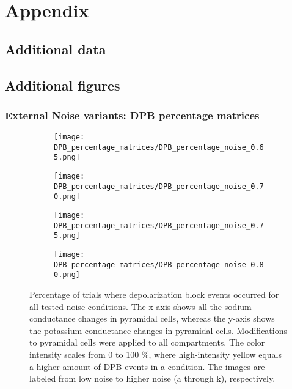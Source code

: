 \chapter{Appendix}\label{ch:appendix_c}

\section{Additional data}

\section{Additional figures}
\pagebreak
\subsection{External Noise variants: DPB percentage matrices}\label{subsec:DPB_percentage_matrices}
\begin{figure}[!ht]
    \centering
    \begin{subfigure}{0.48\textwidth}
        \texttt{[image: DPB\_percentage\_matrices/DPB\_percentage\_noise\_0.65.png]}
        \caption{} %
    \end{subfigure}\hfill
    \begin{subfigure}{0.48\textwidth}
        \texttt{[image: DPB\_percentage\_matrices/DPB\_percentage\_noise\_0.70.png]}
        \caption{} %
    \end{subfigure}

    \bigskip %

    \begin{subfigure}{0.48\textwidth}
        \texttt{[image: DPB\_percentage\_matrices/DPB\_percentage\_noise\_0.75.png]}
        \caption{} %
    \end{subfigure}\hfill
    \begin{subfigure}{0.48\textwidth}
        \texttt{[image: DPB\_percentage\_matrices/DPB\_percentage\_noise\_0.80.png]}
        \caption{} %
    \end{subfigure}

    \caption[DPB percentage matrices (all)]{Percentage of trials where depolarization block events occurred for all tested noise conditions.
        The x-axis shows all the sodium conductance changes in pyramidal cells, whereas the y-axis shows the potassium conductance changes in pyramidal cells.
        Modifications to pyramidal cells were applied to all compartments.
        The color intensity scales from 0 to 100 \%, where high-intensity yellow equals a higher amount of DPB events in a condition.
        The images are labeled from low noise to higher noise (a through k), respectively.}\label{fig:dpb_percentage_matrices_all}
\end{figure}

